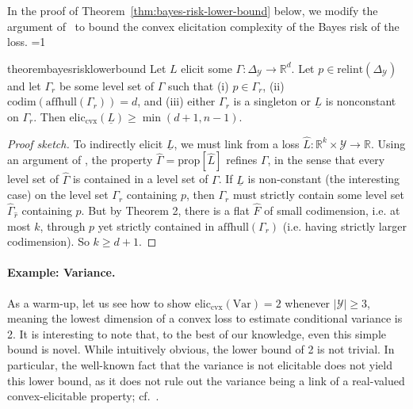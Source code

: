 \documentclass{article}
\newcommand{\Comments}{1}
\newcommand{\mytodo}[2]{\ifnum\Comments=1%
	\todo[linecolor=#1!80!black,backgroundcolor=#1,bordercolor=#1!80!black]{#2}\fi}
\newcommand{\btw}[1]{\mytodo{gray!10!white}{\textcolor{gray}{BTW: #1}}}%
\newcommand{\reals}{\mathbb{R}}
\newcommand{\simplex}{\Delta_\Y}
\newcommand{\relint}[1]{\mathrm{relint}(#1)}
\newcommand{\prop}[1]{\mathrm{prop}[#1]}
\newcommand{\eliccvx}{\mathrm{elic}_\mathrm{cvx}}
\newcommand{\codim}{\mathrm{codim}}
\newcommand{\affhull}{\mathrm{affhull}}
\newcommand{\R}{\mathcal{R}}
\newcommand{\Y}{\mathcal{Y}}
\newcommand{\lbar}{\underline{L}} %
\newcommand{\iden}{\mathrm{iden}}
\newcommand{\Var}{\mathrm{Var}}
\newtheorem{definition}{Definition}
\begin{document}

In the proof of Theorem~\ref{thm:bayes-risk-lower-bound} below, we modify the argument of~\citet[Corollary 7]{frongillo2018elicitation} to bound the convex elicitation complexity of the Bayes risk of the loss.
\btw{Raf Note to self: need to sync the refs to the actual version on arxiv... or something...}
\begin{restatable}{theorem}{bayesrisklowerbound}\label{thm:bayes-risk-lower-bound}
  Let $L$ elicit some $\Gamma:\simplex\to\reals^d$.
  Let $p\in\relint\simplex$ and let $\Gamma_r$ be some level set of $\Gamma$ such that
  (i) $p\in\Gamma_r$,
  (ii) $\codim(\affhull(\Gamma_r))=d$, and
  (iii) either $\Gamma_r$ is a singleton or $\lbar$ is nonconstant on $\Gamma_r$.
  Then $\eliccvx(\lbar) \geq \min(d+1,n-1)$.
\end{restatable}

\begin{proof}[Proof sketch]
  To indirectly elicit $\lbar$, we must link from a loss $\hat L: \reals^k \times \Y \to \reals$.
  Using an argument of \citet[Theorem 4]{frongillo2018elicitation}, the property $\hat\Gamma = \prop{\hat L}$ refines $\Gamma$, in the sense that every level set of $\hat\Gamma$ is contained in a level set of $\Gamma$.
  If $\lbar$ is non-constant (the interesting case) on the level set $\Gamma_r$ containing $p$, then $\Gamma_r$ must strictly contain some level set $\hat \Gamma_{\hat r}$ containing $p$.
  But by Theorem 2, there is a flat $\hat{F}$ of small codimension, i.e. at most $k$, through $p$ yet strictly contained in $\affhull(\Gamma_r)$ (i.e. having strictly larger codimension).
  So $k \geq d + 1$.
\end{proof}


\paragraph{Example: Variance.}
As a warm-up, let us see how to show $\eliccvx(\Var)=2$ whenever $|\Y|\geq 3$, meaning the lowest dimension of a convex loss to estimate conditional variance is 2.
It is interesting to note that, to the best of our knowledge, even this simple bound is novel.
While intuitively obvious, the lower bound of 2 is not trivial.
In particular, the well-known fact that the variance is not elicitable does not yield this lower bound, as it does not rule out the variance being a link of a real-valued convex-elicitable property; cf.~\citet{frongillo2018elicitation}.
\end{document}
